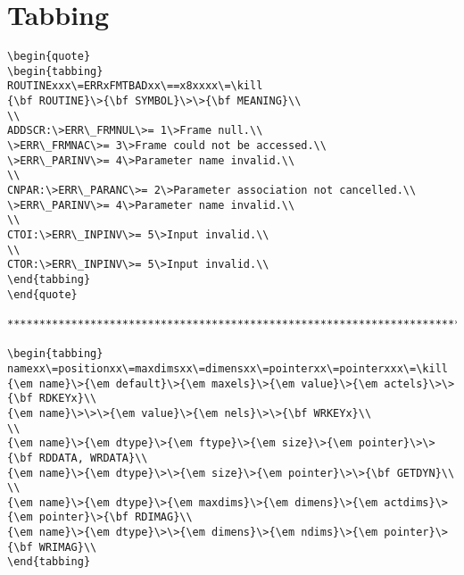 \section{Tabbing}

\begin{verbatim}
\begin{quote}
\begin{tabbing}
ROUTINExxx\=ERRxFMTBADxx\==x8xxxx\=\kill
{\bf ROUTINE}\>{\bf SYMBOL}\>\>{\bf MEANING}\\
\\
ADDSCR:\>ERR\_FRMNUL\>= 1\>Frame null.\\
\>ERR\_FRMNAC\>= 3\>Frame could not be accessed.\\
\>ERR\_PARINV\>= 4\>Parameter name invalid.\\
\\
CNPAR:\>ERR\_PARANC\>= 2\>Parameter association not cancelled.\\
\>ERR\_PARINV\>= 4\>Parameter name invalid.\\
\\
CTOI:\>ERR\_INPINV\>= 5\>Input invalid.\\
\\
CTOR:\>ERR\_INPINV\>= 5\>Input invalid.\\
\end{tabbing}
\end{quote}

********************************************************************************

\begin{tabbing}
namexx\=positionxx\=maxdimsxx\=dimensxx\=pointerxx\=pointerxxx\=\kill
{\em name}\>{\em default}\>{\em maxels}\>{\em value}\>{\em actels}\>\>{\bf RDKEYx}\\
{\em name}\>\>\>{\em value}\>{\em nels}\>\>{\bf WRKEYx}\\
\\
{\em name}\>{\em dtype}\>{\em ftype}\>{\em size}\>{\em pointer}\>\>{\bf RDDATA, WRDATA}\\
{\em name}\>{\em dtype}\>\>{\em size}\>{\em pointer}\>\>{\bf GETDYN}\\
\\
{\em name}\>{\em dtype}\>{\em maxdims}\>{\em dimens}\>{\em actdims}\>{\em pointer}\>{\bf RDIMAG}\\
{\em name}\>{\em dtype}\>\>{\em dimens}\>{\em ndims}\>{\em pointer}\>{\bf WRIMAG}\\
\end{tabbing}
\end{verbatim}

